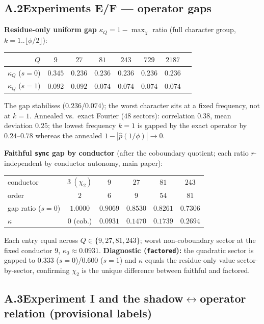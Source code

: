 \documentclass[11pt]{article}
\theoremstyle{remark}
\begin{document}
\subsection*{A.2\quad Experiments E/F --- operator gaps}

\textbf{Residue-only uniform gap} $\kappa_Q=1-\max_\chi$ ratio (full character
group, $k=1..\lfloor\phi/2\rfloor$):
\begin{center}\small
\begin{tabular}{@{}rccccccc@{}}
\toprule
$Q$ & $9$ & $27$ & $81$ & $243$ & $729$ & $2187$\\
\midrule
$\kappa_Q$ ($s{=}0$) & $0.345$ & $0.236$ & $0.236$ & $0.236$ & $0.236$ & $0.236$\\
$\kappa_Q$ ($s{=}1$) & $0.092$ & $0.092$ & $0.074$ & $0.074$ & $0.074$ & $0.074$\\
\bottomrule
\end{tabular}
\end{center}
The gap stabilises ($0.236/0.074$); the worst character sits at a fixed frequency,
not at $k=1$. Annealed vs.\ exact Fourier ($48$ sectors): correlation $0.38$, mean
deviation $0.25$; the lowest frequency $k=1$ is gapped by the exact operator by
$0.24$--$0.78$ whereas the annealed $1-|\hat p(1/\phi)|\to0$.

\textbf{Faithful \texttt{sync} gap by conductor} (after the coboundary quotient;
each ratio $r$-independent by conductor autonomy, main paper):
\begin{center}\small
\begin{tabular}{@{}lccccc@{}}
\toprule
conductor & $3\ (\chi_2)$ & $9$ & $27$ & $81$ & $243$\\
order & $2$ & $6$ & $9$ & $54$ & $81$\\
gap ratio ($s{=}0$) & $1.0000$ & $\mathbf{0.9069}$ & $0.8530$ & $0.8261$ & $0.7306$\\
$\kappa$ & $0$ (cob.) & $\mathbf{0.0931}$ & $0.1470$ & $0.1739$ & $0.2694$\\
\bottomrule
\end{tabular}
\end{center}
Each entry equal across $Q\in\{9,27,81,243\}$; worst non-coboundary sector at the
fixed conductor $9$, $\kappa_0\approx0.0931$. \textbf{Diagnostic
(\texttt{factored}):} the quadratic sector is gapped to $0.333$ ($s{=}0$)/$0.600$
($s{=}1$) and $\kappa$ equals the residue-only value sector-by-sector, confirming
$\chi_2$ is the unique difference between faithful and factored.

\subsection*{A.3\quad Experiment I and the shadow$\leftrightarrow$operator relation (provisional labels)}
\end{document}
